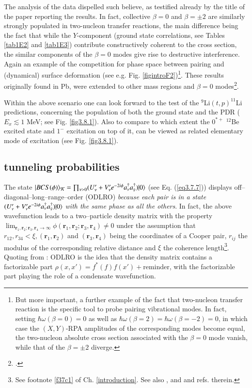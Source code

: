The analysis of the data dispelled such believe, as testified already by the title of the paper reporting the results. In fact, collective $\beta=0$ and $\beta=\pm2$ are similarly strongly populated in two-nucleon transfer reactions, the main difference being the fact that while the $Y$-component (ground state correlations, see Tables \ref{tab1E2} and \ref{tab1E3}) contribute constructively coherent to the cross section, the similar components of the $\beta=0$ modes give rise to destructive interference. Again an example of the competition for phase space between pairing and (dynamical) surface deformation (see e.g. Fig. \ref{figintroF2})\footnote{But more important, a further example of the fact that two-nucleon transfer reaction is the specific tool to probe pairing vibrational modes. In fact, setting $\hbar\omega(\beta=0)=0$ as well as $\hbar\omega(\beta=2)=\hbar\omega(\beta=-2)=0$, in which case the $(X,Y)$-RPA amplitudes of the corresponding modes become equal, the two-nucleon absolute cross section associated with the $\beta=0$ mode vanish, while that of the $\beta=\pm2$ diverge.}. These results originally found in Pb, were extended to other mass regions and $\beta=0$ modes\footnote{\cite{Broglia:71}.}. 


Within the above scenario one can look forward to the test of the $^9$Li$(t,p)^{11}$Li predictions, concerning the population of both the ground state and the PDR ($E_x\lesssim1$ MeV; see Fig. \ref{fig3.8.1}). Also to compare to which extent the $0^{*+}$ $^{12}$Be excited state and $1^-$ excitation on top of it, can be viewed as related elementary mode of excitation (see Fig. \ref{fig3.8.1}).
 \subsection{tunneling probabilities}\label{App4.B.3}
 The state $ |{BCS(\phi)} \rangle_{\mathcal K}=\prod_{\nu>0}(U'_\nu+V'_\nu e^{-2i\phi} a_\nu^\dagger a_{\bar{\nu}}^\dagger)|{0} \rangle$ (see Eq. (\ref{eq3.7.7})) displays off--diagonal--long--range--order (ODLRO) \textit{because each pair is in a state $(U'_\nu+V'_\nu e^{-2i\phi} a_\nu^\dagger a_{\bar{\nu}}^\dagger)|{0} \rangle$ with the same phase as all the others}. In fact, the above wavefunction  leads to a two--particle density matrix with the property $\lim_{\mathbf r_1, \mathbf r_2;\mathbf r_3, \mathbf r_4\rightarrow\infty}\phi(\mathbf r_1, \mathbf r_2;\mathbf r_3, \mathbf r_4)\neq 0$ under the assumption that $r_{12}, r_{34}<\xi, (\mathbf r_1, \mathbf r_2)$ and $(\mathbf r_3, \mathbf r_4)$ being the coordinates of a Cooper pair, $r_{ij}$ the  modulus of the corresponding relative distance and $\xi$ the coherence length\footnote{See footnote \ref{f37c1} of Ch. \ref{introduction}. See also \cite{Ambegaokar:69}, and \cite{Potel:17} and refs. therein.}. Quoting from \cite{Anderson:96}: ODLRO is the idea that the density matrix contains a factorizable part $\rho(x,x')=f^*(f)f(x')+$reminder, with the factorizable part playing the role of a condensate wavefunction.
 

